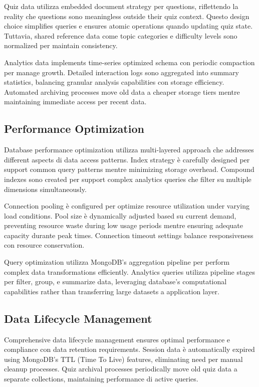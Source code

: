 \documentclass[12pt,a4paper]{article}
\begin{document}
Quiz data utilizza embedded document strategy per questions, riflettendo la reality che questions sono meaningless outside their quiz context. Questo design choice simplifies queries e ensures atomic operations quando updating quiz state. Tuttavia, shared reference data come topic categories e difficulty levels sono normalized per maintain consistency.

Analytics data implements time-series optimized schema con periodic compaction per manage growth. Detailed interaction logs sono aggregated into summary statistics, balancing granular analysis capabilities con storage efficiency. Automated archiving processes move old data a cheaper storage tiers mentre maintaining immediate access per recent data.

\subsection{Performance Optimization}

Database performance optimization utilizza multi-layered approach che addresses different aspects di data access patterns. Index strategy è carefully designed per support common query patterns mentre minimizing storage overhead. Compound indexes sono created per support complex analytics queries che filter su multiple dimensions simultaneously.

Connection pooling è configured per optimize resource utilization under varying load conditions. Pool size è dynamically adjusted based su current demand, preventing resource waste during low usage periods mentre ensuring adequate capacity durante peak times. Connection timeout settings balance responsiveness con resource conservation.

Query optimization utilizza MongoDB's aggregation pipeline per perform complex data transformations efficiently. Analytics queries utilizza pipeline stages per filter, group, e summarize data, leveraging database's computational capabilities rather than transferring large datasets a application layer.

\subsection{Data Lifecycle Management}

Comprehensive data lifecycle management ensures optimal performance e compliance con data retention requirements. Session data è automatically expired using MongoDB's TTL (Time To Live) features, eliminating need per manual cleanup processes. Quiz archival processes periodically move old quiz data a separate collections, maintaining performance di active queries.
\end{document}
